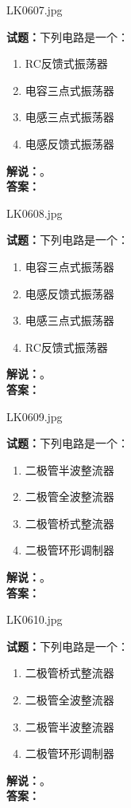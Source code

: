 \documentclass{ctexbook}
\begin{document}
\bigskip

LK0607.jpg

\noindent\textbf{试题：}下列电路是一个：
\begin{enumerate}[leftmargin=3em]
  \item RC反馈式振荡器
  \item 电容三点式振荡器
  \item 电感三点式振荡器
  \item 电感反馈式振荡器
\end{enumerate}
\noindent\textbf{解说：}\textbf{}。\\\noindent\textbf{答案：}

\bigskip

LK0608.jpg

\noindent\textbf{试题：}下列电路是一个：
\begin{enumerate}[leftmargin=3em]
  \item 电容三点式振荡器
  \item 电感反馈式振荡器
  \item 电感三点式振荡器
  \item RC反馈式振荡器
\end{enumerate}
\noindent\textbf{解说：}\textbf{}。\\\noindent\textbf{答案：}

\bigskip

LK0609.jpg

\noindent\textbf{试题：}下列电路是一个：
\begin{enumerate}[leftmargin=3em]
  \item 二极管半波整流器
  \item 二极管全波整流器
  \item 二极管桥式整流器
  \item 二极管环形调制器
\end{enumerate}
\noindent\textbf{解说：}\textbf{}。\\\noindent\textbf{答案：}

\bigskip

LK0610.jpg

\noindent\textbf{试题：}下列电路是一个：
\begin{enumerate}[leftmargin=3em]
  \item 二极管桥式整流器
  \item 二极管全波整流器
  \item 二极管半波整流器
  \item 二极管环形调制器
\end{enumerate}
\noindent\textbf{解说：}\textbf{}。\\\noindent\textbf{答案：}
\end{document}
